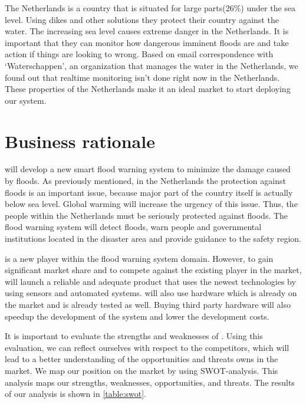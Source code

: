 The Netherlands is a country that is situated for large parts(26\%) under the sea level\cite{holland}. Using dikes and other solutions they protect their country against the water. The increasing sea level causes extreme danger in the Netherlands. It is important that they can monitor how dangerous imminent floods are and take action if things are looking to wrong. Based on email correspondence with `Waterschappen', an organization that manages the water in the Netherlands, we found out that realtime monitoring isn't done right now in the Netherlands. These properties of the Netherlands make it an ideal market to start deploying our system. %

\section{Business rationale}
\CompanyName{} will develop a new smart flood warning system to minimize the damage caused by floods. As previously mentioned, in the Netherlands the protection against floods is an important issue, because major part of the country itself is actually below sea level. Global warming will increase the urgency of this issue. Thus, the people within the Netherlands must be seriously protected against floods. The flood warning system will detect floods, warn people and governmental institutions located in the disaster area and provide guidance to the safety region.


\CompanyName{} is a new player within the flood warning system domain. However, to gain significant market share and to compete against the existing player in the market, \CompanyName{} will launch a reliable and adequate product that uses the newest technologies by using sensors and automated systems. \CompanyName{} will also use hardware which is already on the market and is already tested as well. Buying third party hardware will also speedup the development of the system and lower the development costs.

It is important to evaluate the strengths and weaknesses of \CompanyName{}. Using this evaluation, we can reflect ourselves with respect to the competitors, which will lead to a better understanding of the opportunities and threats \CompanyName{} owns in the market. We map our position on the market by using SWOT-analysis. This analysis maps our strengths, weaknesses, opportunities, and threats. The results of our analysis is shown in \autoref{table:swot}.

